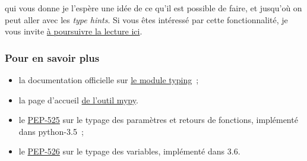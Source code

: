     qui vous donne je l'espère une idée de ce qu'il est possible de faire,
et jusqu'où on peut aller avec les \emph{type hints}. Si vous êtes
intéressé par cette fonctionnalité, je vous invite
\href{https://docs.python.org/3/library/typing.html\#user-defined-generic-types}{à
poursuivre la lecture ici}.

    \hypertarget{pour-en-savoir-plus}{%
\subsubsection{Pour en savoir plus}\label{pour-en-savoir-plus}}

\begin{itemize}
\item
  la documentation officielle sur
  \href{https://docs.python.org/3/library/typing.html}{le module
  typing}~;
\item
  la page d'accueil \href{http://mypy-lang.org/}{de l'outil mypy}.
\item
  le \href{https://www.python.org/dev/peps/pep-0484/}{PEP-525} sur le
  typage des paramètres et retours de fonctions, implémenté dans
  python-3.5~;
\item
  le \href{https://www.python.org/dev/peps/pep-0526/}{PEP-526} sur le
  typage des variables, implémenté dans 3.6.
\end{itemize}


    
    
    

